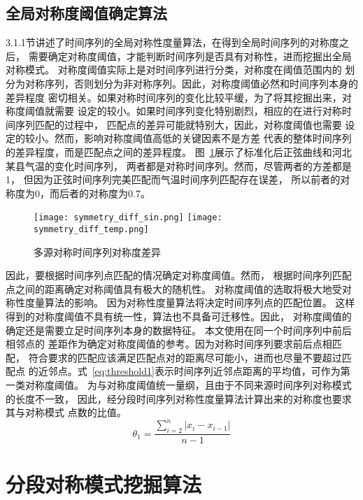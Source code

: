 \subsection{全局对称度阈值确定算法}
3.1.1节讲述了时间序列的全局对称性度量算法，在得到全局时间序列的对称度之后，
需要确定对称度阈值，才能判断时间序列是否具有对称性，进而挖掘出全局对称模式。
对称度阈值实际上是对时间序列进行分类，对称度在阈值范围内的
划分为对称序列，否则划分为非对称序列。因此，对称度阈值必然和时间序列本身的差异程度
密切相关。如果对称时间序列的变化比较平缓，为了将其挖掘出来，对称度阈值就需要
设定的较小。如果时间序列变化特别剧烈，相应的在进行对称时间序列匹配的过程中，
匹配点的差异可能就特别大，因此，对称度阈值也需要
设定的较小。然而，影响对称度阈值高低的关键因素不是方差
代表的整体时间序列的差异程度，而是匹配点之间的差异程度。
图~\ref{fig:symmetry_diff}展示了标准化后正弦曲线和河北某县气温的变化时间序列，
两者都是对称时间序列。然而，尽管两者的方差都是1，
但因为正弦时间序列完美匹配而气温时间序列匹配存在误差，
所以前者的对称度为0，而后者的对称度为0.7。
\begin{figure}
  \centering
  {\texttt{[image: symmetry\_diff\_sin.png]}}
  {\texttt{[image: symmetry\_diff\_temp.png]}}
  \caption{多源对称时间序列对称度差异}
  \label{fig:symmetry_diff}
\end{figure}

因此，要根据时间序列点匹配的情况确定对称度阈值。然而，
根据时间序列匹配点之间的距离确定对称阈值具有极大的随机性。
对称度阈值的选取将极大地受对称性度量算法的影响。
因为对称性度量算法将决定时间序列点的匹配位置。
这样得到的对称度阈值不具有统一性，算法也不具备可迁移性。因此，
对称度阈值的确定还是需要立足时间序列本身的数据特征。
本文使用在同一个时间序列中前后相邻点的
差距作为确定对称度阈值的参考。因为对称时间序列要求前后点相匹配，
符合要求的匹配应该满足匹配点对的距离尽可能小，进而也尽量不要超过匹配点
的近邻点。式~\ref{eq:threshold1}表示时间序列近邻点距离的平均值，可作为第一类对称度阈值。
为与对称度阈值统一量纲，且由于不同来源时间序列对称模式的长度不一致，
因此，经分段时间序列对称性度量算法计算出来的对称度也要求其与对称模式
点数的比值。
\begin{equation}
  \theta_{1}=\frac{\sum_{i=2}^{n}\left|x_{i}-x_{i-1}\right|}{n-1}
  \label{eq:threshold1}
\end{equation}



\section{分段对称模式挖掘算法}

